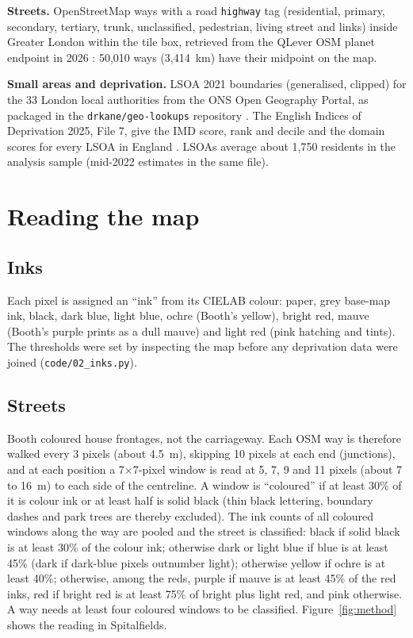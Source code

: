 \documentclass[11pt,a4paper]{article}
\begin{document}
\textbf{Streets.} OpenStreetMap ways with a road \texttt{highway} tag (residential, primary, secondary, tertiary, trunk, unclassified, pedestrian, living street and links) inside Greater London within the tile box, retrieved from the QLever OSM planet endpoint in 2026 \citep{osm}: 50,010 ways (3,414~km) have their midpoint on the map.

\textbf{Small areas and deprivation.} LSOA 2021 boundaries (generalised, clipped) for the 33 London local authorities from the ONS Open Geography Portal, as packaged in the \texttt{drkane/geo-lookups} repository \citep{geolookups}. The English Indices of Deprivation 2025, File 7, give the IMD score, rank and decile and the domain scores for every LSOA in England \citep{iod2025}. LSOAs average about 1,750 residents in the analysis sample (mid-2022 estimates in the same file).

\section{Reading the map}\label{sec:measure}

\subsection{Inks}
Each pixel is assigned an ``ink'' from its CIELAB colour: paper, grey base-map ink, black, dark blue, light blue, ochre (Booth's yellow), bright red, mauve (Booth's purple prints as a dull mauve) and light red (pink hatching and tints). The thresholds were set by inspecting the map before any deprivation data were joined (\texttt{code/02\_inks.py}).

\subsection{Streets}
Booth coloured house frontages, not the carriageway. Each OSM way is therefore walked every 3 pixels (about 4.5~m), skipping 10 pixels at each end (junctions), and at each position a 7$\times$7-pixel window is read at 5, 7, 9 and 11 pixels (about 7 to 16~m) to each side of the centreline. A window is ``coloured'' if at least 30\% of it is colour ink or at least half is solid black (thin black lettering, boundary dashes and park trees are thereby excluded). The ink counts of all coloured windows along the way are pooled and the street is classified: black if solid black is at least 30\% of the colour ink; otherwise dark or light blue if blue is at least 45\% (dark if dark-blue pixels outnumber light); otherwise yellow if ochre is at least 40\%; otherwise, among the reds, purple if mauve is at least 45\% of the red inks, red if bright red is at least 75\% of bright plus light red, and pink otherwise. A way needs at least four coloured windows to be classified. Figure~\ref{fig:method} shows the reading in Spitalfields.
\end{document}

